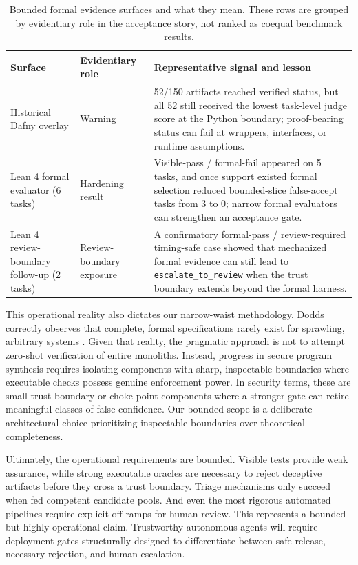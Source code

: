 \documentclass[11pt]{article}
\begin{document}
\begin{table}[h]
\centering
\small
\caption{Bounded formal evidence surfaces and what they mean. These rows are grouped by evidentiary role in the acceptance story, not ranked as coequal benchmark results.}
\label{tab:formal-surfaces}
\begin{tabular}{p{1.35in}p{1.35in}p{2.8in}}
\hline
Surface & Evidentiary role & Representative signal and lesson \\
\hline
Historical Dafny overlay & Warning & 52/150 artifacts reached verified status, but all 52 still received the lowest task-level judge score at the Python boundary; proof-bearing status can fail at wrappers, interfaces, or runtime assumptions. \\
Lean 4 formal evaluator (6 tasks) & Hardening result & Visible-pass / formal-fail appeared on 5 tasks, and once support existed formal selection reduced bounded-slice false-accept tasks from 3 to 0; narrow formal evaluators can strengthen an acceptance gate. \\
Lean 4 review-boundary follow-up (2 tasks) & Review-boundary exposure & A confirmatory formal-pass / review-required timing-safe case showed that mechanized formal evidence can still lead to \texttt{escalate\_to\_review} when the trust boundary extends beyond the formal harness. \\
\hline
\end{tabular}
\end{table}

This operational reality also dictates our narrow-waist methodology. Dodds correctly observes that complete, formal specifications rarely exist for sprawling, arbitrary systems \cite{Dodds2025Specs}. Given that reality, the pragmatic approach is not to attempt zero-shot verification of entire monoliths. Instead, progress in secure program synthesis requires isolating components with sharp, inspectable boundaries where executable checks possess genuine enforcement power. In security terms, these are small trust-boundary or choke-point components where a stronger gate can retire meaningful classes of false confidence. Our bounded scope is a deliberate architectural choice prioritizing inspectable boundaries over theoretical completeness.

Ultimately, the operational requirements are bounded. Visible tests provide weak assurance, while strong executable oracles are necessary to reject deceptive artifacts before they cross a trust boundary. Triage mechanisms only succeed when fed competent candidate pools. And even the most rigorous automated pipelines require explicit off-ramps for human review. This represents a bounded but highly operational claim. Trustworthy autonomous agents will require deployment gates structurally designed to differentiate between safe release, necessary rejection, and human escalation.
\end{document}
